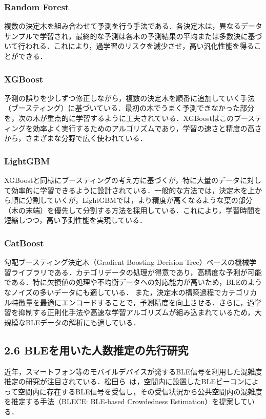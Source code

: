 \subsubsection*{Random Forest}
複数の決定木を組み合わせて予測を行う手法である\cite{randomforest}．各決定木は，異なるデータサンプルで学習され，最終的な予測は各木の予測結果の平均または多数決に基づいて行われる．これにより，過学習のリスクを減少させ，高い汎化性能を得ることができる．

\subsubsection*{XGBoost}
予測の誤りを少しずつ修正しながら，複数の決定木を順番に追加していく手法（ブースティング）に基づいている\cite{xgboost}．最初の木でうまく予測できなかった部分を，次の木が重点的に学習するように工夫されている．XGBoostはこのブースティングを効率よく実行するためのアルゴリズムであり，学習の速さと精度の高さから，さまざまな分野で広く使われている．

\subsubsection*{LightGBM}
XGBoostと同様にブースティングの考え方に基づくが，特に大量のデータに対して効率的に学習できるように設計されている\cite{lightgbm}．一般的な方法では，決定木を上から順に分割していくが，LightGBMでは，より精度が高くなるような葉の部分（木の末端）を優先して分割する方法を採用している．これにより，学習時間を短縮しつつ，高い予測性能を実現している．

\subsubsection*{CatBoost}
勾配ブースティング決定木（Gradient Boosting Decision Tree）ベースの機械学習ライブラリである\cite{catboost}．カテゴリデータの処理が得意であり，高精度な予測が可能である．特に欠損値の処理や不均衡データへの対応能力が高いため，BLEのようなノイズの多いデータにも適している．
また，決定木の構築過程でカテゴリカル特徴量を最適にエンコードすることで，予測精度を向上させる．さらに，過学習を抑制する正則化手法や高速な学習アルゴリズムが組み込まれているため，大規模なBLEデータの解析にも適している．

\subsection*{2.6 BLEを用いた人数推定の先行研究}
近年，スマートフォン等のモバイルデバイスが発するBLE信号を利用した混雑度推定の研究が注目されている．松田ら~\cite{senkou}は，空間内に設置したBLEビーコンによって空間内に存在するBLE信号を受信し，その受信状況から公共空間内の混雑度を推定する手法（BLECE: BLE-based Crowdedness Estimation）を提案している．

